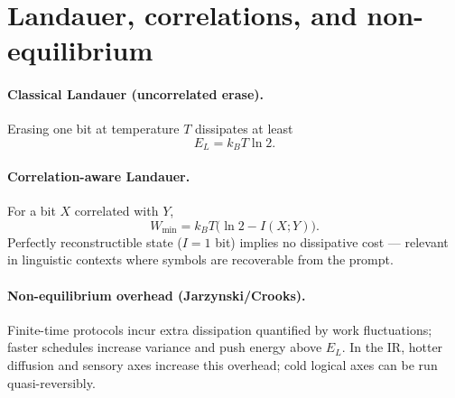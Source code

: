\documentclass[11pt]{article}
\begin{document}
\section{Landauer, correlations, and non-equilibrium}
\paragraph{Classical Landauer (uncorrelated erase).}
Erasing one bit at temperature $T$ dissipates at least
\begin{equation}
E_L = k_B T \ln 2.
\end{equation}
\paragraph{Correlation-aware Landauer.}
For a bit $X$ correlated with $Y$,
\begin{equation}
W_{\min} = k_B T\big(\ln 2 - I(X;Y)\big).
\end{equation}
Perfectly reconstructible state ($I=1$ bit) implies no dissipative cost --- relevant in linguistic contexts where symbols are recoverable from the prompt.
\paragraph{Non-equilibrium overhead (Jarzynski/Crooks).}
Finite-time protocols incur extra dissipation quantified by work fluctuations; faster schedules increase variance and push energy above $E_L$. In the IR, hotter diffusion and sensory axes increase this overhead; cold logical axes can be run quasi-reversibly.
\end{document}
